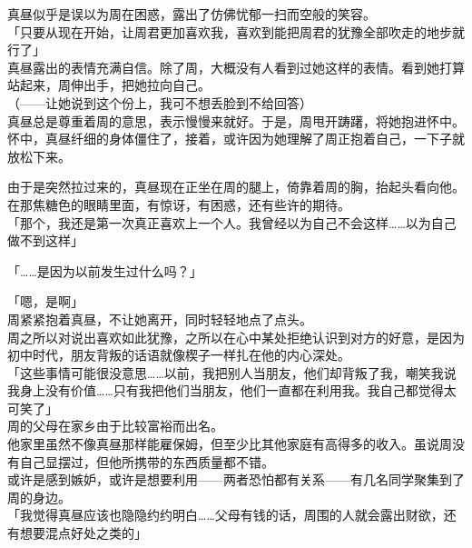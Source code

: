 真昼似乎是误以为周在困惑，露出了仿佛忧郁一扫而空般的笑容。\\

「只要从现在开始，让周君更加喜欢我，喜欢到能把周君的犹豫全部吹走的地步就行了」\\

真昼露出的表情充满自信。除了周，大概没有人看到过她这样的表情。看到她打算站起来，周伸出手，把她拉向自己。\\

（——让她说到这个份上，我可不想丢脸到不给回答）\\

真昼总是尊重着周的意思，表示慢慢来就好。于是，周甩开踌躇，将她抱进怀中。\\

怀中，真昼纤细的身体僵住了，接着，或许因为她理解了周正抱着自己，一下子就放松下来。

由于是突然拉过来的，真昼现在正坐在周的腿上，倚靠着周的胸，抬起头看向他。\\

在那焦糖色的眼睛里面，有惊讶，有困惑，还有些许的期待。\\

「那个，我还是第一次真正喜欢上一个人。我曾经以为自己不会这样……以为自己做不到这样」

「……是因为以前发生过什么吗？」

「嗯，是啊」\\

周紧紧抱着真昼，不让她离开，同时轻轻地点了点头。\\

周之所以对说出喜欢如此犹豫，之所以在心中某处拒绝认识到对方的好意，是因为初中时代，朋友背叛的话语就像楔子一样扎在他的内心深处。\\

「这些事情可能很没意思……以前，我把别人当朋友，他们却背叛了我，嘲笑我说我身上没有价值……只有我把他们当朋友，他们一直都在利用我。我自己都觉得太可笑了」\\

周的父母在家乡由于比较富裕而出名。\\

他家里虽然不像真昼那样能雇保姆，但至少比其他家庭有高得多的收入。虽说周没有自己显摆过，但他所携带的东西质量都不错。\\

或许是感到嫉妒，或许是想要利用——两者恐怕都有关系——有几名同学聚集到了周的身边。\\

「我觉得真昼应该也隐隐约约明白……父母有钱的话，周围的人就会露出财欲，还有想要混点好处之类的」

